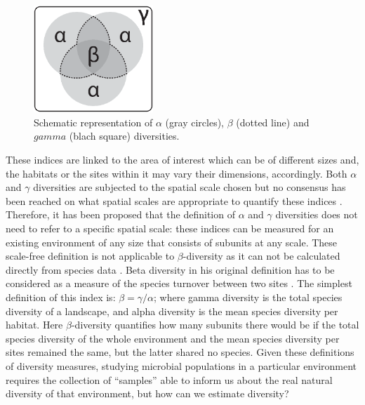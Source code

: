 \begin{figure}[!tb]
	\centering
	\includegraphics[width=0.4\textwidth]{./figures/Introduction/diversities}
  	\caption{Schematic representation of $\alpha$ (gray circles), $\beta$ (dotted line) and $gamma$ (blach square) diversities.\label{fig:diversities}}
\end{figure}
These indices are linked to the area of interest which can be of different sizes and, the habitats or the sites within it may vary their dimensions, accordingly. Both $\alpha$ and $\gamma$ diversities are subjected to the spatial scale chosen but no consensus has been reached on what spatial scales are appropriate to quantify these indices \cite{whittaker2001scale}. Therefore, it has been proposed that the definition of $\alpha$ and $\gamma$ diversities does not need to refer to a specific spatial scale: these indices can be measured for an existing environment of any size that consists of subunits at any scale. These scale-free definition is not applicable to $\beta$-diversity as it can not be calculated directly from species data \cite{tuomisto2010diversity}. Beta diversity in his original definition has to be considered as a measure of the species turnover between two sites \cite{whittaker1960vegetation}. The simplest definition of this index is: $\beta = \gamma/\alpha$; where gamma diversity is the total species diversity of a landscape, and alpha diversity is the mean species diversity per habitat. Here $\beta$-diversity quantifies how many subunits there would be if the total species diversity of the whole environment and the mean species diversity per sites remained the same, but the latter shared no species. Given these definitions of diversity measures, studying microbial populations in a particular environment requires the collection of ``samples'' able to inform us about the real natural diversity of that environment, but how can we estimate diversity?\\

